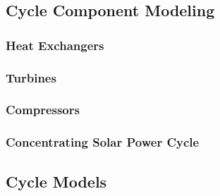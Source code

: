 


\subsection{Cycle Component Modeling}

\subsubsection{Heat Exchangers}
\subsubsection{Turbines}
\subsubsection{Compressors}
\subsubsection{Concentrating Solar Power Cycle}


\subsection{Cycle Models}







